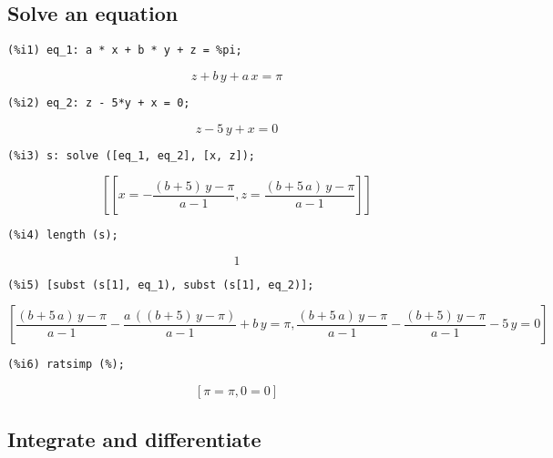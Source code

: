 \documentclass[12pt,leqno]{article}
\begin{document}
\subsection{Solve an equation}
\begin{verbatim}
(%i1) eq_1: a * x + b * y + z = %pi;
\end{verbatim}
\begin{equation}
z+b\,y+a\,x=\pi\tag{\%o1}
\label{eq:doc-group1-code28-1-1}
\end{equation}
\begin{verbatim}
(%i2) eq_2: z - 5*y + x = 0;
\end{verbatim}
\begin{equation}
z-5\,y+x=0\tag{\%o2}
\label{eq:doc-group1-code28-2-1}
\end{equation}
\begin{verbatim}
(%i3) s: solve ([eq_1, eq_2], [x, z]);
\end{verbatim}
\begin{equation}
\left[ \left[ x=-\frac{\left(b+5\right)\,y-\pi}{a-1} , z=\frac{\left(b+5\,a\right)\,y-\pi}{a-1} \right]  \right] \tag{\%o3}
\label{eq:doc-group1-code28-3-1}
\end{equation}
\begin{verbatim}
(%i4) length (s);
\end{verbatim}
\begin{equation}
1\tag{\%o4}
\label{eq:doc-group1-code28-4-1}
\end{equation}
\begin{verbatim}
(%i5) [subst (s[1], eq_1), subst (s[1], eq_2)];
\end{verbatim}
\begin{equation}
\left[ \frac{\left(b+5\,a\right)\,y-\pi}{a-1}-\frac{a\,\left(\left(b+5\right)\,y-\pi\right)}{a-1}+b\,y=\pi , \frac{\left(b+5\,a\right)\,y-\pi}{a-1}-\frac{\left(b+5\right)\,y-\pi}{a-1}-5\,y=0 \right] \tag{\%o5}
\label{eq:doc-group1-code28-5-1}
\end{equation}
\begin{verbatim}
(%i6) ratsimp (%);
\end{verbatim}
\begin{equation}
\left[ \pi=\pi , 0=0 \right] \tag{\%o6}
\label{eq:doc-group1-code28-6-1}
\end{equation}


\subsection{Integrate and differentiate}
\end{document}
